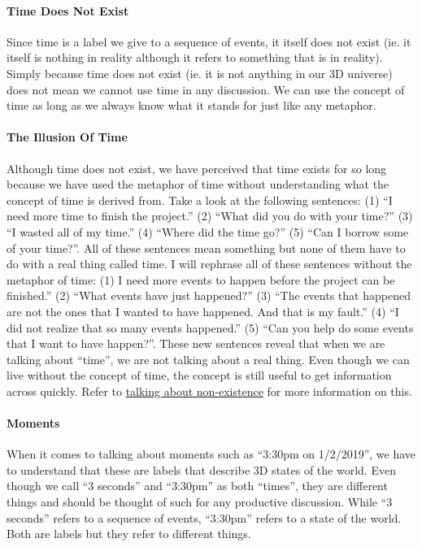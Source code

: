 \documentclass[a4paper, 12pt]{article}
\begin{document}
\paragraph{Time Does Not Exist}
Since time is a label we give to a sequence of events, it itself does not exist (ie. it itself is nothing in reality although it refers to something that is in reality). Simply because time does not exist (ie. it is not anything in our 3D universe) does not mean we cannot use time in any discussion. We can use the concept of time as long as we always know what it stands for just like any metaphor. \\
\paragraph{The Illusion Of Time}
Although time does not exist, we have perceived that time exists for so long because we have used the metaphor of time without understanding what the concept of time is derived from. Take a look at the following sentences: (1) ``I need more time to finish the project.'' (2) ``What did you do with your time?'' (3) ``I wasted all of my time.'' (4) ``Where did the time go?'' (5) ``Can I borrow some of your time?''. All of these sentences mean something but none of them have to do with a real thing called time. I will rephrase all of these sentences without the metaphor of time: (1) I need more events to happen before the project can be finished.'' (2) ``What events have just happened?'' (3) ``The events that happened are not the ones that I wanted to have happened. And that is my fault.'' (4) ``I did not realize that so many events happened.'' (5) ``Can you help do some events that I want to have happen?''. These new sentences reveal that when we are talking about ``time'', we are not talking about a real thing. Even though we can live without the concept of time, the concept is still useful to get information across quickly. Refer to \underline{talking about non-existence} for more information on this. \\
\paragraph{Moments}
When it comes to talking about moments such as ``3:30pm on 1/2/2019'', we have to understand that these are labels that describe 3D states of the world. Even though we call ``3 seconds'' and ``3:30pm'' as both ``times'', they are different things and should be thought of such for any productive discussion. While ``3 seconds'' refers to a sequence of events, ``3:30pm'' refers to a state of the world. Both are labels but they refer to different things. \\
\end{document}
